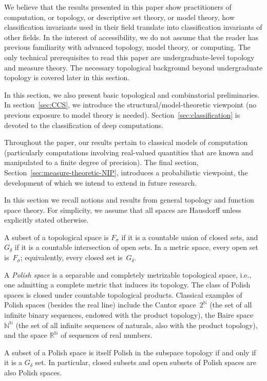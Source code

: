 We believe that the results presented in this paper show practitioners of computation, or topology, or descriptive set theory, or model theory, how classification invariants used in their field translate into classification invariants of other fields.
In the interest of accessibility, we do not assume that the reader has previous familiarity with advanced topology, model theory, or computing.
The only technical prerequisites to read this paper are undergraduate-level topology and measure theory.
The necessary topological background beyond undergraduate topology is covered later in this section.

In this section, we also present basic topological and combinatorial preliminaries. In section~\ref{sec:CCS}, we introduce the structural/model-theoretic viewpoint (no previous exposure to model theory is needed).
Section~\ref{sec:classification} is devoted to the classification of deep computations.

Throughout the paper, our results pertain to classical models of computation (particularly computations involving real-valued quantities that are known and manipulated to a finite degree of precision).
The final section, Section~\ref{sec:measure-theoretic-NIP}, introduces a probabilistic viewpoint, the development of which we intend to extend in future research.

In this section we recall notions and results from general topology and function space theory.
For simplicity, we assume that all spaces are Hausdorff unless explicitly stated otherwise.

A subset of a topological space is $F_\sigma$ if it is a countable union of closed sets, and $G_\delta$ if it is a countable intersection of open sets.
In a metric space, every open set is~$F_\sigma$; equivalently, every closed set is~$G_\delta$.

A \emph{Polish space} is a separable and completely metrizable topological space, i.e., one admitting a complete metric that induces its topology.
The class of Polish spaces is closed under countable topological products.
Classical examples of Polish spaces (besides the real line) include the Cantor space~$2^\mathbb{N}$ (the set of all infinite binary sequences, endowed with the product topology), the Baire space $\mathbb{N}^\mathbb{N}$ (the set of all infinite sequences of naturals, also with the product topology), and the space $\mathbb{R}^\mathbb{N}$ of sequences of real numbers.

\begin{fact}\cite[4.3.24]{Engelking:1989}
A subset of a Polish space is itself Polish in the subspace topology if and only if it is a $G_{\delta }$ set.
In particular, closed subsets and open subsets of Polish spaces are also Polish spaces.
\end{fact}

